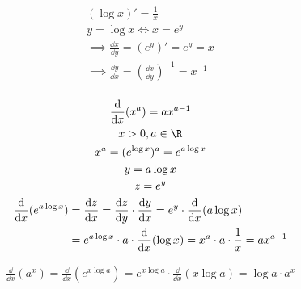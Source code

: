 \begin{bsp*}
	\begin{gather*}
		(\log x)' = \frac{1}{x} \\
		y = \log x \iff x = e^y \\
		\implies \frac{\dd x}{\dd y} = (e^y)' = e^y = x \\
		\implies \frac{\dd y}{\dd x} = \left( \frac{\dd x}{\dd y} \right) ^{-1} = x^{-1} \\
	\end{gather*}
\end{bsp*}
\begin{bsp*}
	\begin{gather*}
		\frac{\dd}{\dd x} (x^a) = a x^{a-1} \\
		x > 0 , a \in \R \\
		x^a = (e^{\log x})^a = e^{a \log x} \\
		y = a \log x \\
		z = e^y \\
		\begin{split}
			\frac{\dd}{\dd x} (e^{a \log x})	&= \frac{\dd z}{\dd x} = \frac{\dd z}{\dd y} \cdot \frac{\dd y}{\dd x} = e^y \cdot \frac{\dd}{\dd x} (a \log x ) \\
								&= e^{a \log x} \cdot a \cdot \frac{\dd}{\dd x} (\log x) = x^a \cdot a \cdot \frac{1}{x} = a x^{a-1}
		\end{split}
	\end{gather*}
\end{bsp*}
\begin{bsp*}
	\begin{gather*}
		\frac{\dd}{\dd x} (a^x) = \frac{\dd}{\dd x} (e^{x \log a}) = e^{x \log a} \cdot \frac{\dd}{\dd x} (x \log a) = \log a \cdot a^x
	\end{gather*}
\end{bsp*}
